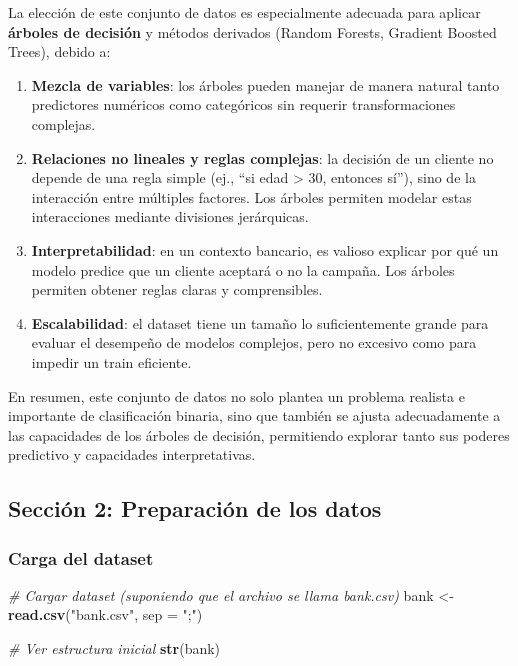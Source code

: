 \documentclass[
]{article}
\newenvironment{Shaded}{\begin{snugshade}}{\end{snugshade}}
\newcommand{\AttributeTok}[1]{\textcolor[rgb]{0.13,0.29,0.53}{#1}}
\newcommand{\CommentTok}[1]{\textcolor[rgb]{0.56,0.35,0.01}{\textit{#1}}}
\newcommand{\FunctionTok}[1]{\textcolor[rgb]{0.13,0.29,0.53}{\textbf{#1}}}
\newcommand{\NormalTok}[1]{#1}
\newcommand{\OtherTok}[1]{\textcolor[rgb]{0.56,0.35,0.01}{#1}}
\newcommand{\StringTok}[1]{\textcolor[rgb]{0.31,0.60,0.02}{#1}}
\providecommand{\tightlist}{%
  \setlength{\itemsep}{0pt}\setlength{\parskip}{0pt}}
\begin{document}
La elección de este conjunto de datos es especialmente adecuada para
aplicar \textbf{árboles de decisión} y métodos derivados (Random
Forests, Gradient Boosted Trees), debido a:

\begin{enumerate}
\def\labelenumi{\arabic{enumi}.}
\tightlist
\item
  \textbf{Mezcla de variables}: los árboles pueden manejar de manera
  natural tanto predictores numéricos como categóricos sin requerir
  transformaciones complejas.
\item
  \textbf{Relaciones no lineales y reglas complejas}: la decisión de un
  cliente no depende de una regla simple (ej., ``si edad \textgreater{}
  30, entonces sí''), sino de la interacción entre múltiples factores.
  Los árboles permiten modelar estas interacciones mediante divisiones
  jerárquicas.
\item
  \textbf{Interpretabilidad}: en un contexto bancario, es valioso
  explicar por qué un modelo predice que un cliente aceptará o no la
  campaña. Los árboles permiten obtener reglas claras y comprensibles.
\item
  \textbf{Escalabilidad}: el dataset tiene un tamaño lo suficientemente
  grande para evaluar el desempeño de modelos complejos, pero no
  excesivo como para impedir un train eficiente.
\end{enumerate}

En resumen, este conjunto de datos no solo plantea un problema realista
e importante de clasificación binaria, sino que también se ajusta
adecuadamente a las capacidades de los árboles de decisión, permitiendo
explorar tanto sus poderes predictivo y capacidades interpretativas.

\subsection{Sección 2: Preparación de los
datos}\label{secciuxf3n-2-preparaciuxf3n-de-los-datos}

\subsubsection{Carga del dataset}\label{carga-del-dataset}

\begin{Shaded}
\begin{Highlighting}[]
\CommentTok{\# Cargar dataset (suponiendo que el archivo se llama bank.csv)}
\NormalTok{bank }\OtherTok{\textless{}{-}} \FunctionTok{read.csv}\NormalTok{(}\StringTok{"bank.csv"}\NormalTok{, }\AttributeTok{sep =} \StringTok{";"}\NormalTok{)}

\CommentTok{\# Ver estructura inicial}
\FunctionTok{str}\NormalTok{(bank)}
\end{Highlighting}
\end{Shaded}
\end{document}
